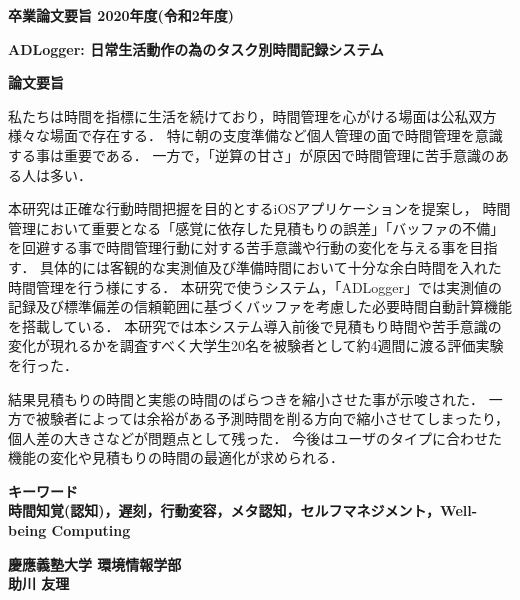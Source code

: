 \begin{center}
\textbf{\Large 卒業論文要旨 2020年度(令和2年度)}

\vspace{6.18mm}

\textbf{\Large ADLogger: 日常生活動作の為のタスク別時間記録システム}
\end{center}

\vspace{10mm}

\begin{flushleft}
\textbf{論文要旨}\\
\end{flushleft}

私たちは時間を指標に生活を続けており，時間管理を心がける場面は公私双方様々な場面で存在する．
特に朝の支度準備など個人管理の面で時間管理を意識する事は重要である．
一方で，「逆算の甘さ」が原因で時間管理に苦手意識のある人は多い．

本研究は正確な行動時間把握を目的とするiOSアプリケーションを提案し，
時間管理において重要となる「感覚に依存した見積もりの誤差」「バッファの不備」を回避する事で時間管理行動に対する苦手意識や行動の変化を与える事を目指す．
具体的には客観的な実測値及び準備時間において十分な余白時間を入れた時間管理を行う様にする．
本研究で使うシステム，「ADLogger」では実測値の記録及び標準偏差の信頼範囲に基づくバッファを考慮した必要時間自動計算機能を搭載している．
本研究では本システム導入前後で見積もり時間や苦手意識の変化が現れるかを調査すべく大学生20名を被験者として約4週間に渡る評価実験を行った．

結果見積もりの時間と実態の時間のばらつきを縮小させた事が示唆された．
一方で被験者によっては余裕がある予測時間を削る方向で縮小させてしまったり，個人差の大きさなどが問題点として残った．
今後はユーザのタイプに合わせた機能の変化や見積もりの時間の最適化が求められる．

\begin{flushleft}
\textbf{キーワード}\\
\textbf{時間知覚(認知)，遅刻，行動変容，メタ認知，セルフマネジメント，Well-being Computing}

\end{flushleft}

\begin{flushright}
\textbf{慶應義塾大学 環境情報学部}\\
\textbf{助川 友理}
\end{flushright}
\newpage

